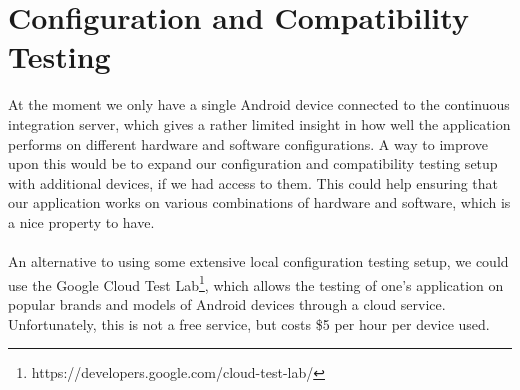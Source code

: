 
\section{Configuration and Compatibility Testing}
\label{sec:extension_of_continuous_integration_server}

At the moment we only have a single Android device connected to the continuous integration server, which gives a rather limited insight in how well the application performs on different hardware and software configurations. A way to improve upon this would be to expand our configuration and compatibility testing setup with additional devices, if we had access to them. This could help ensuring that our application works on various combinations of hardware and software, which is a nice property to have. 
\\\\
An alternative to using some extensive local configuration testing setup, we could use the Google Cloud Test Lab\footnote{https://developers.google.com/cloud-test-lab/}, which allows the testing of one's application on popular brands and models of Android devices through a cloud service. Unfortunately, this is not a free service, but costs \$5 per hour per device used. 